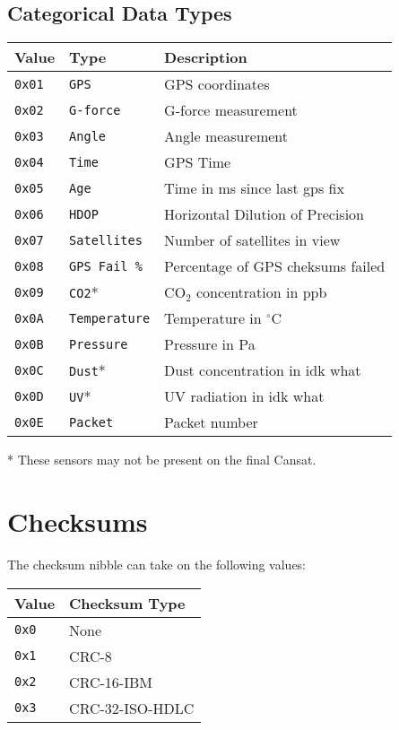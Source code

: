 \documentclass[a4paper]{article}
\begin{document}
\subsection{Categorical Data Types}
\begin{longtable}{@{}lll@{}}
\toprule
Value    & Type             & Description                  \\
\midrule
\texttt{0x01} & \texttt{GPS}        & GPS coordinates                  \\
\texttt{0x02} & \texttt{G-force}    & G-force measurement              \\
\texttt{0x03} & \texttt{Angle}      & Angle measurement                \\
\texttt{0x04} & \texttt{Time}       & GPS Time                         \\
\texttt{0x05} & \texttt{Age}        & Time in ms since last gps fix    \\
\texttt{0x06} & \texttt{HDOP}       & Horizontal Dilution of Precision \\
\texttt{0x07} & \texttt{Satellites} & Number of satellites in view     \\
\texttt{0x08} & \texttt{GPS Fail \%}& Percentage of GPS cheksums failed\\
\texttt{0x09} & \texttt{CO2}*       & CO$_2$ concentration in ppb      \\
\texttt{0x0A} & \texttt{Temperature}& Temperature in $^\circ$C         \\
\texttt{0x0B} & \texttt{Pressure}   & Pressure in Pa                   \\
\texttt{0x0C} & \texttt{Dust}*      & Dust concentration in idk what   \\
\texttt{0x0D} & \texttt{UV}*        & UV radiation in idk what         \\
\texttt{0x0E} & \texttt{Packet}     & Packet number                    \\
\bottomrule
\end{longtable}
* These sensors may not be present on the final Cansat.

\section{Checksums}\label{checksums}
The checksum nibble can take on the following values:
\begin{longtable}{@{}ll@{}}
\toprule
Value    & Checksum Type     \\
\midrule
\texttt{0x0} & None              \\
\texttt{0x1} & CRC-8             \\
\texttt{0x2} & CRC-16-IBM        \\
\texttt{0x3} & CRC-32-ISO-HDLC   \\
\bottomrule
\end{longtable}
\end{document}
